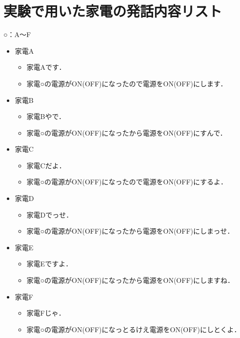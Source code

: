 \documentclass[a4j,12pt,twoside]{jreport}
\begin{document}
\chapter{実験で用いた家電の発話内容リスト}
\label{sec:セリフ}
○：A〜F
\begin{itemize}
	\item 家電A
	\begin{itemize}
		\item 家電Aです．
		\item 家電○の電源がON(OFF)になったので電源をON(OFF)にします．
	\end{itemize}

	\item 家電B
	\begin{itemize}
		\item 家電Bやで．
		\item 家電○の電源がON(OFF)になったから電源をON(OFF)にすんで．
	\end{itemize}

	
	\item 家電C
	\begin{itemize}
		\item 家電Cだよ．
		\item 家電○の電源がON(OFF)になったので電源をON(OFF)にするよ．
	\end{itemize}

		
	\item 家電D
	\begin{itemize}
	\item 家電Dでっせ．
		\item 家電○の電源がON(OFF)になったから電源をON(OFF)にしまっせ．
	\end{itemize}


	\item 家電E
	\begin{itemize}
		\item 家電Eですよ．
		\item 家電○の電源がON(OFF)になったから電源をON(OFF)にしますね．
	\end{itemize}

	\item 家電F
	\begin{itemize}
		\item 家電Fじゃ．
		\item 家電○の電源がON(OFF)になっとるけえ電源をON(OFF)にしとくよ．
	\end{itemize}
\end{itemize}

\newpage
\end{document}
